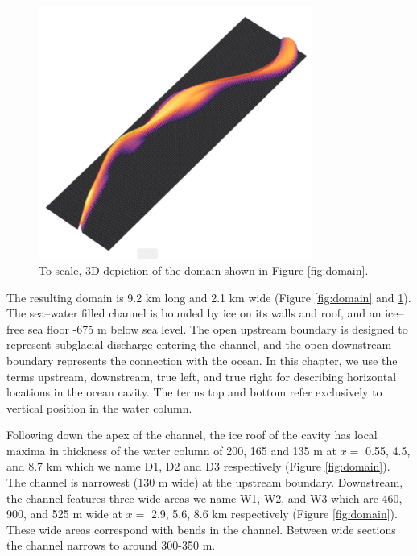 \begin{figure}[!ht]
\centering
\includegraphics[width=0.8\textwidth]{chapters/4/3d_domain.png}
\caption[3D domain]{To scale, 3D depiction of the domain shown in Figure \ref{fig:domain}. }
\label{fig:3d_domain}
\end{figure}

The resulting domain is 9.2 km long and 2.1 km wide (Figure \ref{fig:domain} and \ref{fig:3d_domain}). The sea--water filled channel is bounded by ice on its walls and roof, and an ice--free sea floor -675 m below sea level. The open upstream boundary is designed to represent subglacial discharge entering the channel, and the open downstream boundary represents the connection with the ocean. In this chapter, we use the terms upstream, downstream, true left, and true right for describing horizontal locations in the ocean cavity. 
The terms top and bottom refer exclusively to vertical position in the water column.

Following down the apex of the channel, the ice roof of the cavity has local maxima in thickness of the water column of 200, 165 and 135 m at $x=$ 0.55, 4.5, and 8.7 km which we name D1, D2 and D3 respectively (Figure \ref{fig:domain}). The channel is narrowest (130 m wide) at the upstream boundary. Downstream, the channel features three wide areas we name W1, W2, and W3 which are 460, 900, and 525 m wide at $x =$ 2.9, 5.6, 8.6 km respectively (Figure \ref{fig:domain}). These wide areas correspond with bends in the channel. Between wide sections the channel narrows to around 300-350 m. 


